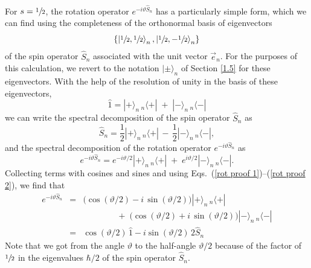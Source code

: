 For $s = \sfrac12$, the rotation operator $e^{-i\vartheta \hat{S}_n}$ has a particularly simple form, which we can find using 
the completeness of the orthonormal basis of eigenvectors 
\begin{equation}
\left\{ \left|  \sfrac12,\sfrac12 \right\rangle_{n}, \left|  \sfrac12, -\sfrac12 \right\rangle_{n} \right\}
\label{onb spin S_n}
\end{equation}
of the spin operator $\hat{S}_n$ associated with the unit vector $\vec{e}_n$. For the purposes of this calculation, we revert to the notation $| \pm \rangle_n$ of Section \ref{1.5} for these eigenvectors. With the help of the resolution of unity in the basis of these eigenvectors,
\begin{equation}
\hat{1} = |+\rangle_{\!n} \, _{n\!}\langle +| \; + \; |-\rangle_{\!n} \, _{n\!}\langle -|
\label{rot proof 1}
\end{equation}
we can write the spectral decomposition of the spin operator $\hat{S}_n$ as
\begin{equation}
\hat{S}_n = \textstyle{\frac12} |+\rangle_{\!n} \, _{n\!}\langle + | \, - \, \textstyle{\frac12} |-\rangle_{\!n} \, _{n\!}\langle -|,
\label{rot proof 2}
\end{equation}
and the spectral decomposition of the rotation operator $e^{-i\vartheta \hat{S}_n}$ as
\begin{equation}
e^{-i\vartheta \hat{S}_n} = e^{-i\vartheta/2} |+\rangle_{\!n} \, _{n\!}\langle + | \; + \; e^{i\vartheta/2} |-\rangle_{\!n} \, _{n\!}\langle -|.
\label{rot proof 3}
\end{equation}
Collecting terms with cosines and sines and using Eqs.\ (\ref{rot proof 1})--(\ref{rot proof 2}), we find that
\begin{eqnarray}
e^{-i\vartheta \hat{S}_n} & \!\! = \!\! & \Big( \cos{\!(\vartheta/2)} - i \, \sin{\!(\vartheta/2)} \Big) |+\rangle_{\!n} \, _{n\!}\langle + | \nonumber \\
 & & \quad \quad \quad \quad + \; \Big(\cos{\!(\vartheta/2)} + i \, \sin{\!(\vartheta/2)} \Big) | -\rangle_{\!n} \, _{n\!}\langle - | \nonumber \\
 & \!\! = \!\!  & \cos{\!(\vartheta/2)} \, \hat{1} - i \sin{\!(\vartheta/2)} \, 2\hat{S}_n
 \label{rot proof 4}
\end{eqnarray}
Note that we got from the angle $\vartheta$ to the half-angle $\vartheta/2$ because of the factor of $\sfrac12$ in the eigenvalues $\hbar/2$ of the spin operator $\hat{S}_n$. 

